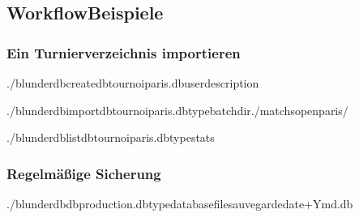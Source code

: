 \documentclass[letterpaper,10pt,german]{sphinxmanual}
\begin{document}
\subsection{Workflow\sphinxhyphen{}Beispiele}
\label{\detokenize{cli:exemples-de-flux-de-travail}}

\subsubsection{Ein Turnierverzeichnis importieren}
\label{\detokenize{cli:import-d-un-repertoire-de-tournoi}}
\begin{sphinxVerbatim}[commandchars=\\\{\}]
./blunderdbcreate\PYGZhy{}\PYGZhy{}dbtournoi\PYGZus{}paris.db\PYGZhy{}\PYGZhy{}user\PYGZhy{}\PYGZhy{}description

./blunderdbimport\PYGZhy{}\PYGZhy{}dbtournoi\PYGZus{}paris.db\PYGZhy{}\PYGZhy{}typebatch\PYGZhy{}\PYGZhy{}dir./matchs\PYGZus{}open\PYGZus{}paris/

./blunderdblist\PYGZhy{}\PYGZhy{}dbtournoi\PYGZus{}paris.db\PYGZhy{}\PYGZhy{}typestats
\end{sphinxVerbatim}


\subsubsection{Regelmäßige Sicherung}
\label{\detokenize{cli:sauvegarde-reguliere}}
\begin{sphinxVerbatim}[commandchars=\\\{\}]
./blunderdb\PYGZhy{}\PYGZhy{}dbproduction.db\PYGZhy{}\PYGZhy{}typedatabase\PYGZhy{}\PYGZhy{}filesauvegarde\PYGZhy{}date+\PYGZpc{}Y\PYGZpc{}m\PYGZpc{}d.db
\end{sphinxVerbatim}
\end{document}
